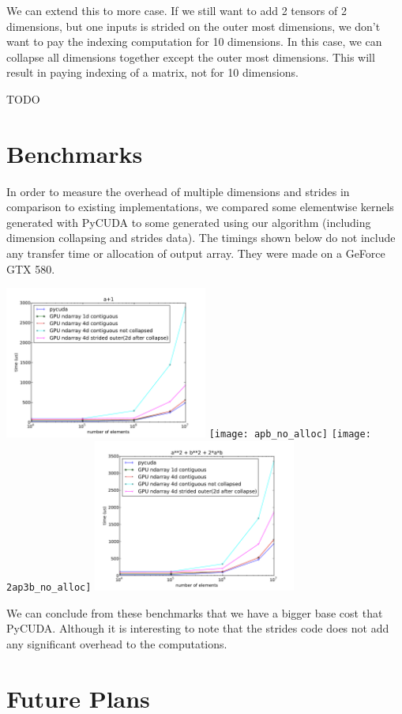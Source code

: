 \documentclass{article} %
\begin{document}
We can extend this to more case. If we still want to add 2 tensors of
2 dimensions, but one inputs is strided on the outer most dimensions,
we don't want to pay the indexing computation for 10 dimensions. In
this case, we can collapse all dimensions together except the outer
most dimensions. This will result in paying indexing of a matrix, not
for 10 dimensions.


TODO

\section{Benchmarks}

In order to measure the overhead of multiple dimensions and strides in comparison to existing implementations, we compared some elementwise kernels generated with PyCUDA to some generated using our algorithm (including dimension collapsing and strides data).
The timings shown below do not include any transfer time or allocation of output array.
They were made on a GeForce GTX 580.

\includegraphics[width=0.5\textwidth]{ap1_no_alloc}
\texttt{[image: apb\_no\_alloc]}
\texttt{[image: 2ap3b\_no\_alloc]}
\includegraphics[width=0.5\textwidth]{a2pb2p2ab_no_alloc}

We can conclude from these benchmarks that we have a bigger base cost that PyCUDA.
Although it is interesting to note that the strides code does not add any significant overhead to the computations.

\section{Future Plans}
\end{document}

